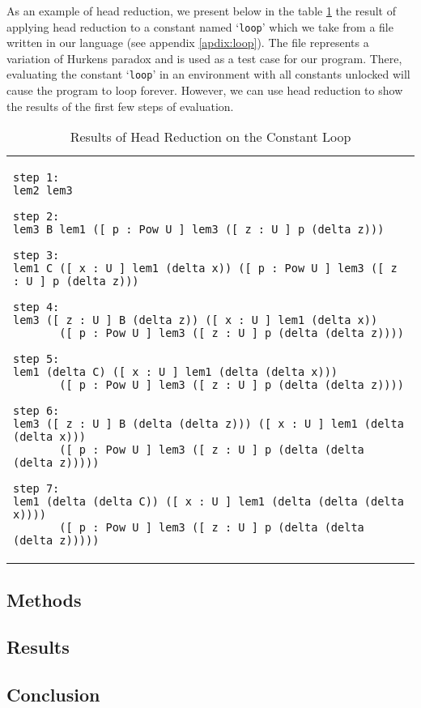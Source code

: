 \documentclass{article}
\theoremstyle{remark}
\begin{document}
As an example of head reduction, we present below in the table \ref{tab:head-loop} the result of applying head reduction to a constant named `\texttt{loop}' which we take from a file written in our language (see appendix \ref{apdix:loop}). The file represents a variation of Hurkens paradox \cite{hurkens1995simplification} and is used as a test case for our program. There, evaluating the constant `\texttt{loop}' in an environment with all constants unlocked will cause the program to loop forever. However, we can use head reduction to show the results of the first few steps of evaluation.

\begin{table}[h]
  \centering
  \begin{tabular}{m{10cm}}
\begin{verbatim}
step 1:
lem2 lem3

step 2:
lem3 B lem1 ([ p : Pow U ] lem3 ([ z : U ] p (delta z)))

step 3:
lem1 C ([ x : U ] lem1 (delta x)) ([ p : Pow U ] lem3 ([ z : U ] p (delta z)))

step 4:
lem3 ([ z : U ] B (delta z)) ([ x : U ] lem1 (delta x))
       ([ p : Pow U ] lem3 ([ z : U ] p (delta (delta z))))

step 5:
lem1 (delta C) ([ x : U ] lem1 (delta (delta x)))
       ([ p : Pow U ] lem3 ([ z : U ] p (delta (delta z))))

step 6:
lem3 ([ z : U ] B (delta (delta z))) ([ x : U ] lem1 (delta (delta x)))
       ([ p : Pow U ] lem3 ([ z : U ] p (delta (delta (delta z)))))

step 7:
lem1 (delta (delta C)) ([ x : U ] lem1 (delta (delta (delta x))))
       ([ p : Pow U ] lem3 ([ z : U ] p (delta (delta (delta z)))))
\end{verbatim}
  \end{tabular}
  \caption{Results of Head Reduction on the Constant Loop}
  \label{tab:head-loop}
\end{table}

\subsection{Methods}

\subsection{Results}

\subsection{Conclusion}
\end{document}
